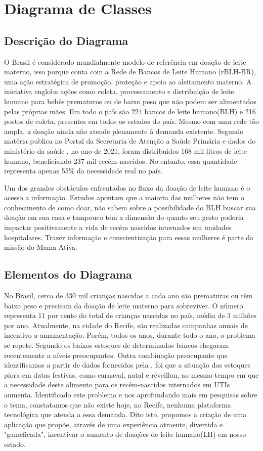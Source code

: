 \chapter{Diagrama de Classes}


\section{Descrição do Diagrama}

O Brasil é considerado mundialmente modelo de referência em doação de leite materno, isso porque conta com a Rede de Bancos de Leite Humano (rBLH-BR), uma ação estratégica de promoção, proteção e apoio ao aleitamento materno. A iniciativa engloba ações como coleta, processamento e distribuição de leite humano para bebês prematuros ou de baixo peso que não podem ser alimentados pelas próprias mães. Em todo o país são 224 bancos de leite humano(BLH) e 216 postos de coleta, presentes em todos os estados do país.
Mesmo com uma rede tão ampla, a doação ainda não atende plenamente à demanda existente. Segundo matéria publica no Portal da Secretaria de Atenção a Saúde Primária e dados do ministério da saúde \cite{SAPS}, no ano de 2021, foram distribuídos 168 mil litros de leite humano, beneficiando 237 mil recém-nascidos. No entanto, essa quantidade representa apenas 55\% da necessidade real no país.

Um dos grandes obstáculos enfrentados no fluxo da doação de leite humano é o acesso a informação. Estudos apontam que a maioria das mulheres não tem o conhecimento de como doar, não sabem sobre a possibilidade do BLH buscar sua doação em sua casa e tampouco tem a dimensão do quanto seu gesto poderia impactar positivamente a vida de recém nascidos internados em unidades hospitalares. Trazer informação e conscientização para essas mulheres é parte da missão do Mama Ativa.

\section{Elementos do Diagrama}
No Brasil, cerca de 330 mil crianças nascidas a cada ano são prematuras ou têm baixo peso e precisam da doação de leite materno para sobreviver. O número representa 11 por cento do total de crianças nascidas no país, média de 3 milhões por ano.\cite{SAPS}
Atualmente, na cidade do Recife, são realizadas campanhas anuais de incentivo a amamentação. Porém, todos os anos, durante todo o ano, o problema se repete. Segundo \cite{FolhadePernambuco} os baixos estoques de determinados bancos chegaram recentemente a níveis preocupantes. Outra combinação preocupante que identificamos a partir de dados fornecidos pela \cite{RedeBLH}, foi que a situação dos estoques piora em datas festivas, como carnaval, natal e réveillon, ao mesmo tempo em que a necessidade deste alimento para os recém-nascidos internados em UTIs aumenta.
Identificado este problema e nos aprofundando mais em pesquisas sobre o tema, constatamos que não existe hoje, no Recife, nenhuma plataforma tecnológica que atenda a essa demanda. Dito isto, propomos a criação de uma aplicação que propõe, através de uma experiência atraente, divertida e "gameficada", incentivar o aumento de doações de leite humano(LH) em nosso estado.

